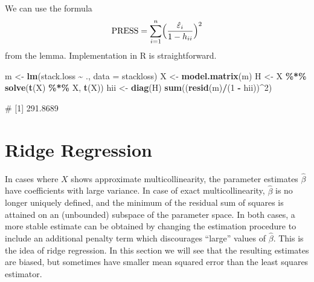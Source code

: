 \documentclass[
  a4paper,
]{article}
\newenvironment{Shaded}{\begin{snugshade}}{\end{snugshade}}
\newcommand{\AttributeTok}[1]{\textcolor[rgb]{0.13,0.29,0.53}{#1}}
\newcommand{\DecValTok}[1]{\textcolor[rgb]{0.00,0.00,0.81}{#1}}
\newcommand{\FunctionTok}[1]{\textcolor[rgb]{0.13,0.29,0.53}{\textbf{#1}}}
\newcommand{\NormalTok}[1]{#1}
\newcommand{\OtherTok}[1]{\textcolor[rgb]{0.56,0.35,0.01}{#1}}
\newcommand{\SpecialCharTok}[1]{\textcolor[rgb]{0.81,0.36,0.00}{\textbf{#1}}}
\theoremstyle{definition}
\theoremstyle{definition}
\theoremstyle{definition}
\theoremstyle{definition}
\theoremstyle{remark}
\begin{document}
\begin{myanswers}

We can use the formula
\begin{equation*}
  \mathrm{PRESS}
  = \sum_{i=1}^n \Bigl( \frac{\hat\varepsilon_i}{1 - h_{ii}} \Bigr)^2
\end{equation*}
from the lemma. Implementation in R is straightforward.

\begin{Shaded}
\begin{Highlighting}[]
\NormalTok{m }\OtherTok{\textless{}{-}} \FunctionTok{lm}\NormalTok{(stack.loss }\SpecialCharTok{\textasciitilde{}}\NormalTok{ ., }\AttributeTok{data =}\NormalTok{ stackloss)}
\NormalTok{X }\OtherTok{\textless{}{-}} \FunctionTok{model.matrix}\NormalTok{(m)}
\NormalTok{H }\OtherTok{\textless{}{-}}\NormalTok{ X }\SpecialCharTok{\%*\%} \FunctionTok{solve}\NormalTok{(}\FunctionTok{t}\NormalTok{(X) }\SpecialCharTok{\%*\%}\NormalTok{ X, }\FunctionTok{t}\NormalTok{(X))}
\NormalTok{hii }\OtherTok{\textless{}{-}} \FunctionTok{diag}\NormalTok{(H)}
\FunctionTok{sum}\NormalTok{((}\FunctionTok{resid}\NormalTok{(m)}\SpecialCharTok{/}\NormalTok{(}\DecValTok{1} \SpecialCharTok{{-}}\NormalTok{ hii))}\SpecialCharTok{\^{}}\DecValTok{2}\NormalTok{)}
\end{Highlighting}
\end{Shaded}

\begin{Shaded}
\begin{Highlighting}[]
\NormalTok{\# [1] 291.8689}
\end{Highlighting}
\end{Shaded}

\end{myanswers}

\clearpage

\section{Ridge Regression}\label{S16-ridge}

In cases where \(X\) shows approximate multicollinearity, the parameter estimates
\(\hat\beta\) have coefficients with large variance. In case of exact
multicollinearity, \(\hat\beta\) is no longer uniquely defined, and the minimum
of the residual sum of squares is attained on an (unbounded) subspace of the
parameter space. In both cases, a more stable estimate can be obtained by
changing the estimation procedure to include an additional penalty term which
discourages ``large'' values of \(\hat\beta\). This is the idea of ridge
regression. In this section we will see that the resulting estimates are
biased, but sometimes have smaller mean squared error than the least squares
estimator.
\end{document}
